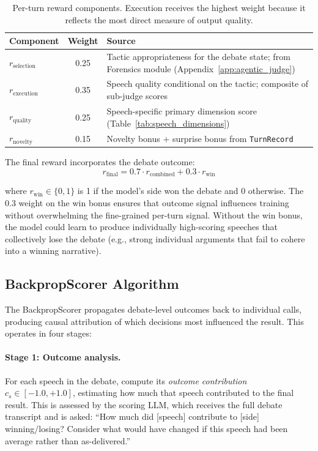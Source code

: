 \begin{table}[h]
\centering
\small
\begin{tabular}{lcp{6.5cm}}
\toprule
\textbf{Component} & \textbf{Weight} & \textbf{Source} \\
\midrule
$r_{\text{selection}}$ & 0.25 & Tactic appropriateness for the debate state; from Forensics module (Appendix~\ref{app:agentic_judge}) \\
$r_{\text{execution}}$ & 0.35 & Speech quality conditional on the tactic; composite of sub-judge scores \\
$r_{\text{quality}}$ & 0.25 & Speech-specific primary dimension score (Table~\ref{tab:speech_dimensions}) \\
$r_{\text{novelty}}$ & 0.15 & Novelty bonus $+$ surprise bonus from \texttt{TurnRecord} \\
\bottomrule
\end{tabular}
\caption{Per-turn reward components. Execution receives the highest weight
because it reflects the most direct measure of output quality.}
\label{tab:reward_components}
\end{table}

The final reward incorporates the debate outcome:
\begin{equation}
r_{\text{final}} = 0.7 \cdot r_{\text{combined}} + 0.3 \cdot r_{\text{win}}
\label{eq:final_reward}
\end{equation}

\noindent where $r_{\text{win}} \in \{0, 1\}$ is 1 if the model's side
won the debate and 0 otherwise. The 0.3 weight on the win bonus ensures
that outcome signal influences training without overwhelming the
fine-grained per-turn signal. Without the win bonus, the model could
learn to produce individually high-scoring speeches that collectively
lose the debate (e.g., strong individual arguments that fail to
cohere into a winning narrative).

\subsection{BackpropScorer Algorithm}

The BackpropScorer propagates debate-level outcomes back to individual
calls, producing causal attribution of which decisions most influenced
the result. This operates in four stages:

\paragraph{Stage 1: Outcome analysis.}
For each speech in the debate, compute its \emph{outcome contribution}
$c_s \in [-1.0, +1.0]$, estimating how much that speech contributed to
the final result. This is assessed by the scoring LLM, which receives
the full debate transcript and is asked: ``How much did [speech] contribute
to [side] winning/losing? Consider what would have changed if this speech
had been average rather than as-delivered.''


